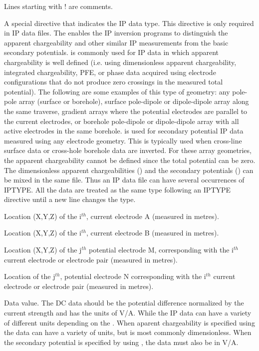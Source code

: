 \begin{description}[leftmargin=5cm, style=sameline, align=left]
\item[\codeName{!}] Lines starting with ! are comments.
\item[\codeName{IPTYPE}] A special directive that indicates the IP data type. This directive is only required in IP data files. The  enables the IP inversion programs to distinguish the apparent chargeability and other similar IP measurements from the basic secondary potentials.  is commonly used for IP data in which apparent chargeability is well defined (i.e. using dimensionless apparent chargeability, integrated chargeability, PFE, or phase data acquired using electrode configurations that do not produce zero crossings in the measured total potential). The following are some examples of this type of geometry: any pole-pole array (surface or borehole), surface pole-dipole or dipole-dipole array along the same traverse, gradient arrays where the potential electrodes are parallel to the current electrodes, or borehole pole-dipole or dipole-dipole array with all active electrodes in the same borehole.  is used for secondary potential IP data measured using any electrode geometry. This is typically used when cross-line surface data or cross-hole borehole data are inverted. For these array geometries, the apparent chargeability cannot be defined since the total potential can be zero. The dimensionless apparent chargeabilities () and the secondary potentials () can be mixed in the same file. Thus an IP data file can have several occurrences of IPTYPE. All the data are treated as the same type following an IPTYPE directive until a new line changes the type.
\item[\codeName{XA(i),YA(i),ZA(i)}] Location (X,Y,Z) of the i$^{th}$, current electrode A (measured in metres).
\item[\codeName{XB(i),YB(i),ZB(i)}] Location (X,Y,Z) of the i$^{th}$, current electrode B (measured in metres). 
\item[\codeName{XM(i,j),YM(i,j),ZM(i,j)}] Location (X,Y,Z) of the j$^{th}$ potential electrode M, corresponding with the i$^{th}$ current electrode or electrode pair (measured in metres).
\item[\codeName{XN(i,j),YN(i,j),ZN(i,j)}] Location of the j$^{th}$, potential electrode N corresponding with the i$^{th}$ current electrode or electrode pair (measured in metres).
\item[\codeName{V(i,j)}] Data value. The DC data should be the potential difference normalized by the current strength and has the units of V/A. While the IP data can have a variety of different units depending on the . When aparent chargeability is specified using  the data can have a variety of units, but is most commonly dimensionless. When the secondary potential is specified by using , the data must also be in V/A.

\end{description}
